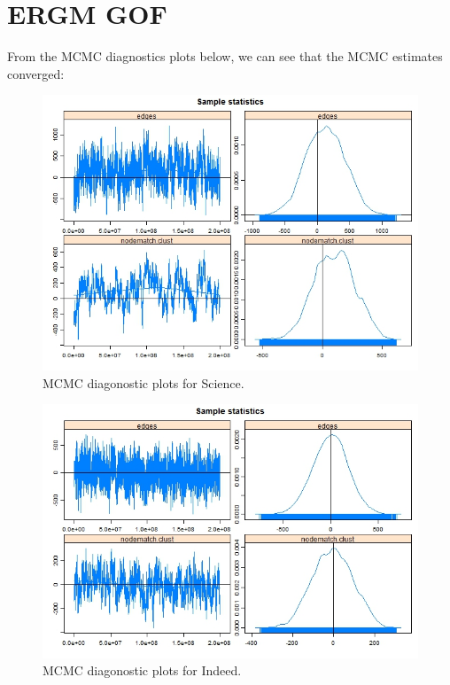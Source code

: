 \documentclass[12pt]{article}
\begin{document}
\newpage
\hypertarget{B}{}
\section{ERGM GOF}
From the MCMC diagnostics plots below, we can see that the MCMC estimates converged:
\vspace{2mm}
\begin{figure}[H]
	\centering
	\includegraphics[scale=0.4]{Images/sci_mcmc1.jpeg} 
	\caption{MCMC diagonostic plots for Science.}
\end{figure}
\vspace{2mm}
\begin{figure}[H] \label{fig.3}
	\centering
	\includegraphics[scale=0.4]{Images/ind_mcmc1.jpeg} 
	\caption{MCMC diagonostic plots for Indeed.}
\end{figure}
\end{document}
